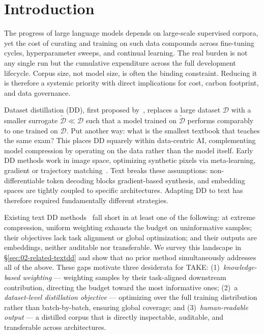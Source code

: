 \section{Introduction} \label{sec:01-introduction}
\begin{foldable} %
  The progress of large language models depends on large-scale supervised corpora, yet the cost of curating and training on such data compounds across fine-tuning cycles, hyperparameter sweeps, and continual learning.
  The real burden is not any single run but the cumulative expenditure across the full development lifecycle.
  Corpus size, not model size, is often the binding constraint.
  Reducing it is therefore a systemic priority with direct implications for cost, carbon footprint, and data governance.
\end{foldable}

\begin{foldable} %
  Dataset distillation (DD), first proposed by~\cite{wang2018dataset}, replaces a large dataset $\mathcal{D}$ with a smaller surrogate $\tilde{\mathcal{D}} \ll \mathcal{D}$ such that a model trained on $\tilde{\mathcal{D}}$ performs comparably to one trained on $\mathcal{D}$.
  Put another way: what is the smallest textbook that teaches the same exam?
  This places DD squarely within data-centric AI, complementing model compression by operating on the data rather than the model itself.
  Early DD methods work in image space, optimizing synthetic pixels via meta-learning, gradient or trajectory matching~\cite{wang2018dataset,zhao2020dataset,cazenavette2022dataset}.
  Text breaks these assumptions: non-differentiable token decoding blocks gradient-based synthesis, and embedding spaces are tightly coupled to specific architectures.
  Adapting DD to text has therefore required fundamentally different strategies.
\end{foldable}

\begin{foldable} %
  Existing text DD methods~\cite{sucholutsky2021soft,li2021data,maekawa2023dataset,maekawa2024dilm,tao2024textual} fall short in at least one of the following: at extreme compression, uniform weighting exhausts the budget on uninformative samples; their objectives lack task alignment or global optimization; and their outputs are embeddings, neither auditable nor transferable.
  We survey this landscape in \S\ref{sec:02-related-textdd} and show that no prior method simultaneously addresses all of the above.
  These gaps motivate three desiderata for TAKE:{
    (1)~\emph{knowledge-based weighting} --- weighting samples by their task-aligned downstream contribution, directing the budget toward the most informative ones;
    (2)~a \emph{dataset-level distillation objective} --- optimizing over the full training distribution rather than batch-by-batch, ensuring global coverage;
    and (3)~\emph{human-readable output} --- a distilled corpus that is directly inspectable, auditable, and transferable across architectures.
  }
\end{foldable}

